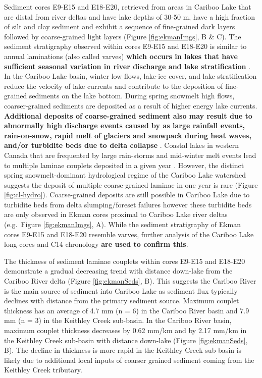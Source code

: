 \documentclass[Royal,times,doublespace,sageh]{sagej}
\begin{document}
Sediment cores E9-E15 and E18-E20, retrieved from areas in Cariboo Lake
that are distal from river deltas and have lake depths of 30-50 m, have
a high fraction of silt and clay sediment and exhibit a sequence of
fine-grained dark layers followed by coarse-grained light layers (Figure
\ref{fig:ekmanImgs}, B \& C). The sediment stratigraphy observed within
cores E9-E15 and E18-E20 is similar to annual laminations (also called
varves) \textbf{which occurs in lakes that have sufficient seasonal
variation in river discharge and lake stratification}
\citep{Cockburn2008, Zolitschka2015a, Heideman2015, Hodder2006b, Desloges1999}.
In the Cariboo Lake basin, winter low flows, lake-ice cover, and lake
stratification reduce the velocity of lake currents and contribute to
the deposition of fine-grained sediments on the lake bottom. During
spring snowmelt high flows, coarser-grained sediments are deposited as a
result of higher energy lake currents. \textbf{Additional deposits of
coarse-grained sediment also may result due to abnormally high discharge
events caused by as large rainfall events, rain-on-snow, rapid melt of
glaciers and snowpack during heat waves, and/or turbidite beds due to
delta collapse} \citep{sabatier2022}. Coastal lakes in western Canada
that are frequented by large rain-storms and mid-winter melt events lead
to multiple laminae couplets deposited in a given year
\citep{Menounos2008c}. However, the distinct spring snowmelt-dominant
hydrological regime of the Cariboo Lake watershed suggests the deposit
of multiple coarse-grained laminae in one year is rare (Figure
\ref{fig:cl-hydro}). Coarse-grained deposits are still possible in
Cariboo Lake due to turbidite beds from delta slumping/foreset failures
however these turbidite beds are only observed in Ekman cores proximal
to Cariboo Lake river deltas (e.g.~Figure \ref{fig:ekmanImgs}, A). While
the sediment stratigraphy of Ekman cores E9-E15 and E18-E20 resemble
varves, further analysis of the Cariboo Lake long-cores and C14
chronology \textbf{are used to confirm this}.

The thickness of sediment laminae couplets within cores E9-E15 and
E18-E20 demonstrate a gradual decreasing trend with distance down-lake
from the Cariboo River delta (Figure \ref{fig:ekmanSeds}, B). This
suggests the Cariboo River is the main source of sediment into Cariboo
Lake as sediment flux typically declines with distance from the primary
sediment source. Maximum couplet thickness has an average of 4.7 mm (n =
6) in the Cariboo River basin and 7.9 mm (n = 3) in the Keithley Creek
sub-basin. In the Cariboo River basin, maximum couplet thickness
decreases by 0.62 mm/km and by 2.17 mm/km in the Keithley Creek
sub-basin with distance down-lake (Figure \ref{fig:ekmanSeds}, B). The
decline in thickness is more rapid in the Keithley Creek sub-basin is
likely due to additional local inputs of coarser grained sediment coming
from the Keithley Creek tributary.
\end{document}
